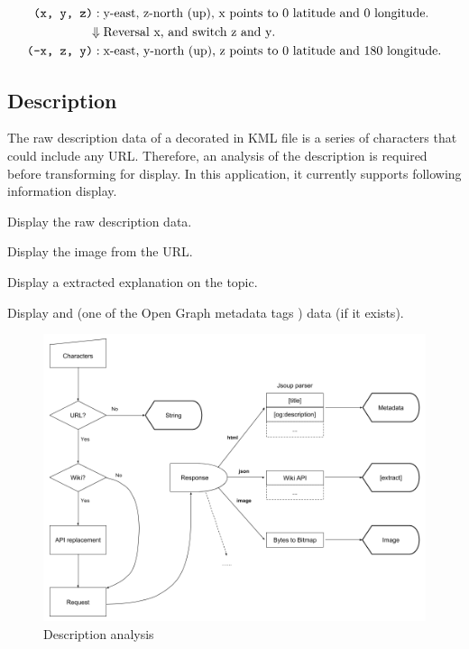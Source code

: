 \[
\begin{array}{lr}
\begin{aligned}
\texttt{(x, y, z)}:\;&\text{y-east, z-north (up), x points to $0$ latitude and $0$ longitude}.\\
\Downarrow\;&\text{Reversal x, and switch z and y}.\\
\texttt{(-x, z, y)}:\;&\text{x-east, y-north (up), z points to $0$ latitude and $180$ longitude}.\\
\end{aligned}
\end{array}
\]

\subsection{Description}

The raw description data of a  decorated in KML file is a series of characters that could include any URL. Therefore, an analysis of the description is required before transforming for display. In this application, it currently supports following information display.

\begin{description}
	\setlength{\parskip}{0pt}
	\item[$\bullet$ Plain text] Display the raw description data.
	\item[$\bullet$ Image] Display the image from the URL.
	\item[$\bullet$ Wikipedia] Display a extracted explanation on the topic.
	\item[$\bullet$ HTML] Display  and  (one of the Open Graph metadata tags \cite{ogp.2014}) data (if it exists).
\end{description}

\begin{figure}[H]
\caption{Description analysis}
\label{fig:description-analysis}
\centering
\includegraphics[width=\linewidth]{Figures/description-analysis.png}
\decoRule
\end{figure}

